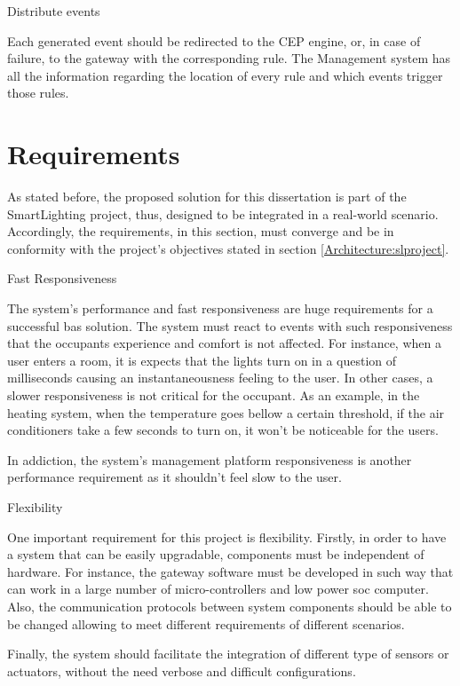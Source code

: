 \begin{Paragraph}{Distribute events}
	
Each generated event should be redirected to the CEP engine, or, in case of failure, to the gateway with the corresponding rule. The Management system has all the information regarding the location of every rule and which events trigger those rules. 
	
\end{Paragraph}



\fi 
\section{Requirements}
\label{Architecture:Requirements}
As stated before, the proposed solution for this dissertation is part of the SmartLighting project, thus, designed to be integrated in a real-world scenario. Accordingly, the requirements, in this section, must converge and be in conformity with the project's objectives stated in section \ref{Architecture:slproject}. 

\begin{Paragraph}{Fast Responsiveness}

The system's performance and fast responsiveness are huge requirements for a successful \ac{bas} solution. The system must react to events with such responsiveness that the occupants experience and comfort is not affected. For instance, when a user enters a room, it is expects that the lights turn on in a question of milliseconds causing an instantaneousness feeling to the user. In other cases, a slower responsiveness is not critical for the occupant. As an example, in the heating system, when the temperature goes bellow a certain threshold, if the air conditioners take a few seconds to turn on, it won't be noticeable for the users.

In addiction, the system's management platform responsiveness is another performance requirement as it shouldn't feel slow to the user.

\end{Paragraph}

\begin{Paragraph}{Flexibility}

One important requirement for this project is flexibility. Firstly, in order to have a system that can be easily upgradable, components must be independent of hardware. For instance, the gateway software must be developed in such way that can work in a large number of micro-controllers and  low power \ac{soc} computer. Also, the communication protocols between system components should be able to be changed allowing to meet different requirements of different scenarios. 


Finally, the system should facilitate the integration of different type of sensors or actuators, without the need verbose and difficult configurations.

\end{Paragraph}

